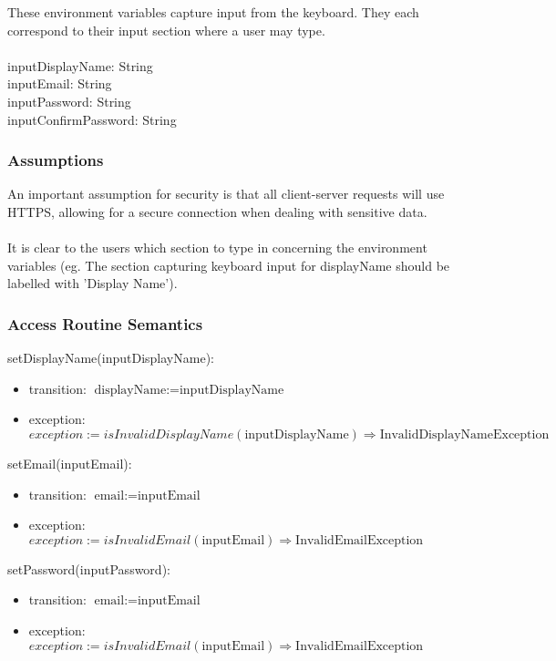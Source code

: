 \documentclass[12pt, titlepage]{article}
\begin{document}
These environment variables capture input from the keyboard. They each correspond to their input section where a user may type. \\ \\
inputDisplayName: String \\ 
inputEmail: String \\ 
inputPassword: String  \\ 
inputConfirmPassword: String  \\ 

\subsubsection{Assumptions}
An important assumption for security is that all client-server requests will use HTTPS, allowing for a secure connection when dealing with sensitive data.
\\
\\ It is clear to the users which section to type in concerning the environment variables (eg. The section capturing keyboard input for displayName should be labelled with 'Display Name'). 

\subsubsection{Access Routine Semantics}

\noindent setDisplayName(inputDisplayName):
\begin{itemize}
\item transition: $\text{displayName} := \text{inputDisplayName}$
\item exception: \\$exception := isInvalidDisplayName(\text{inputDisplayName}) \Rightarrow \text{InvalidDisplayNameException}$
\end{itemize}

\noindent setEmail(inputEmail):
\begin{itemize}
\item transition: $\text{email} := \text{inputEmail}$
\item exception: $exception := isInvalidEmail(\text{inputEmail}) \Rightarrow \text{InvalidEmailException}$
\end{itemize}

\noindent setPassword(inputPassword):
\begin{itemize}
\item transition: $\text{email} := \text{inputEmail}$
\item exception: $exception := isInvalidEmail(\text{inputEmail}) \Rightarrow \text{InvalidEmailException}$
\end{itemize}
\end{document}
